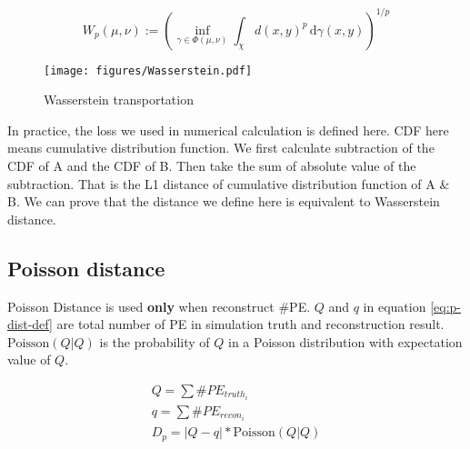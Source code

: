 \label{sub:Wasserstein distance}
    \begin{equation}
        W_{p}(\mu,\nu):=\left(\inf_{\gamma\in\Phi(\mu,\nu)}\int_{\chi}d(x,y)^{p}\,\mathrm{d}\gamma(x,y)\right)^{1/p}
        \label{eq:w-dist-def}
    \end{equation}
    \begin{figure}[H]
        \centering
            \texttt{[image: figures/Wasserstein.pdf]}
        \caption{Wasserstein transportation}
        \label{fig:Wasserstein transportation}
    \end{figure}

In practice, the loss we used in numerical calculation is defined here. CDF here means cumulative distribution function.  We first calculate subtraction of the CDF of A and the CDF of B. Then take the sum of absolute value of the subtraction. That is the L1 distance of cumulative distribution function of A \& B. We can prove that the distance we define here is equivalent to Wasserstein distance. 

\subsection{Poisson distance}
Poisson Distance is used \textbf{only} when reconstruct \#PE. $Q$ and $q$ in equation \ref{eq:p-dist-def} are total number of PE in simulation truth and reconstruction result. $\mathrm{Poisson}(Q|Q)$ is the probability of $Q$ in a Poisson distribution with expectation value of $Q$. 

\label{sub:Poisson distance}
    \begin{align}
        Q = \sum \#PE_{truth_i} \\
        q = \sum \#PE_{recon_i} \\
        D_{p} = |Q-q|*\mathrm{Poisson}(Q|Q)
        \label{eq:p-dist-def}
    \end{align}

